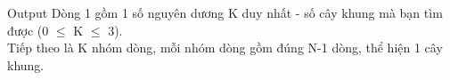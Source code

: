 Output
Dòng 1 gồm 1 số nguyên dương K duy nhất - số cây khung mà bạn tìm được (0  $\le$  K  $\le$  3).
\\Tiếp theo là K nhóm dòng, mỗi nhóm dòng gồm đúng N-1 dòng, thể hiện 1 cây khung.